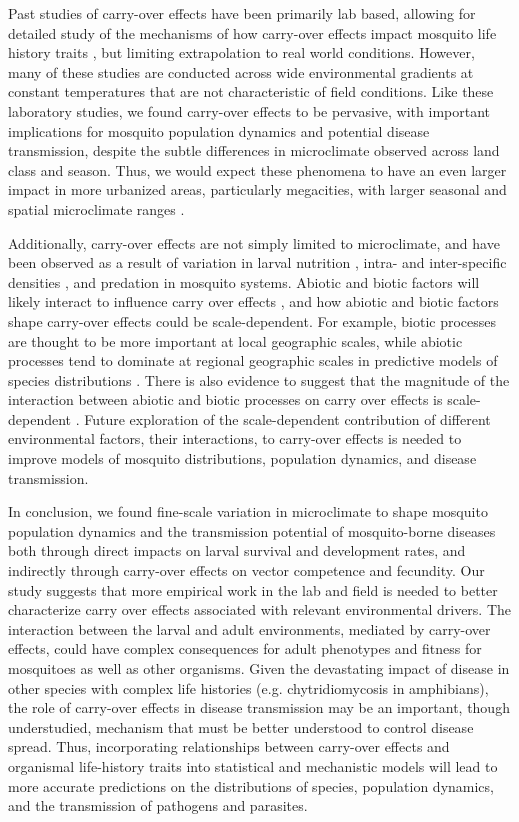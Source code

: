 \documentclass[12pt]{article}
\begin{document}
Past studies of carry-over effects have been primarily lab based, allowing for detailed study of the mechanisms of how carry-over effects impact mosquito life history traits \citep{alto2008, alto2005}, but limiting extrapolation to real world conditions. However, many of these studies are conducted across wide environmental gradients at constant temperatures that are not characteristic of field conditions. Like these laboratory studies, we found carry-over effects to be pervasive, with important implications for mosquito population dynamics and potential disease transmission, despite the subtle differences in microclimate observed across land class and season. Thus, we would expect these phenomena to have an even larger impact in more urbanized areas, particularly megacities, with larger seasonal and spatial microclimate ranges \citep{peng2012}.

Additionally, carry-over effects are not simply limited to microclimate, and have been observed as a result of variation in larval nutrition \citep{moller-jacobs2014}, intra- and inter-specific densities \citep{reiskind2009a, alto2005, alto2008}, and predation \citep{roux2015a} in mosquito systems. Abiotic and biotic factors will likely interact to influence carry over effects \citep{buckner2016, muturi2011d, muturi2012a, muturi2011b, muturi2010}, and how abiotic and biotic factors shape carry-over effects could be scale-dependent. For example, biotic processes are thought to be more important at local geographic scales, while abiotic processes tend to dominate at regional geographic scales in predictive models of species distributions \citep{cohen2016}. There is also evidence to suggest that the magnitude of the interaction between abiotic and biotic processes on carry over effects is scale-dependent \citep{leisnham2014}. Future exploration of the scale-dependent contribution of different environmental factors, their interactions, to carry-over effects is needed to improve models of mosquito distributions, population dynamics, and disease transmission.

In conclusion, we found fine-scale variation in microclimate to shape mosquito population dynamics and the transmission potential of mosquito-borne diseases both through direct impacts on larval survival and development rates, and indirectly through carry-over effects on vector competence and fecundity. Our study suggests that more empirical work in the lab and field is needed to better characterize carry over effects associated with relevant environmental drivers. The interaction between the larval and adult environments, mediated by carry-over effects, could have complex consequences for adult phenotypes and fitness for mosquitoes as well as other organisms. Given the devastating impact of disease in other species with complex life histories (e.g. chytridiomycosis in amphibians), the role of carry-over effects in disease transmission may be an important, though understudied, mechanism that must be better understood to control disease spread. Thus, incorporating relationships between carry-over effects and organismal life-history traits into statistical and mechanistic models will lead to more accurate predictions on the distributions of species, population dynamics, and the transmission of pathogens and parasites.
\end{document}
